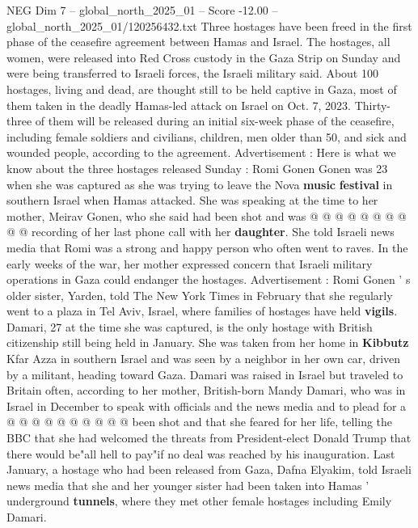 \begin{textsample}{NEG Dim 7 – global\_north\_2025\_01 – Score -12.00 – global\_north\_2025\_01/120256432.txt}  \label{ex:f7_neg_051}
Three hostages have been freed in the first phase of the ceasefire agreement between Hamas and Israel.
The hostages, all women, were released into Red Cross custody in the Gaza Strip on Sunday and were being transferred to Israeli forces, the Israeli military said.
About 100 hostages, living and dead, are thought still to be held captive in Gaza, most of them taken in the deadly Hamas-led attack on Israel on Oct. 7, 2023.
Thirty-three of them will be released during an initial six-week phase of the ceasefire, including female soldiers and civilians, children, men older than 50, and sick and wounded people, according to the agreement.
Advertisement : Here is what we know about the three hostages released Sunday : Romi Gonen Gonen was 23 when she was captured as she was trying to leave the Nova \textbf{music} \textbf{festival} in southern Israel when Hamas attacked.
She was speaking at the time to her mother, Meirav Gonen, who she said had been shot and was @ @ @ @ @ @ @ @ @ @ recording of her last phone call with her \textbf{daughter}.
She told Israeli news media that Romi was a strong and happy person who often went to raves.
In the early weeks of the war, her mother expressed concern that Israeli military operations in Gaza could endanger the hostages.
Advertisement : Romi Gonen ' s older sister, Yarden, told The New York Times in February that she regularly went to a plaza in Tel Aviv, Israel, where families of hostages have held \textbf{vigils}.
Damari, 27 at the time she was captured, is the only hostage with British citizenship still being held in January.
She was taken from her home in \textbf{Kibbutz} Kfar Azza in southern Israel and was seen by a neighbor in her own car, driven by a militant, heading toward Gaza.
Damari was raised in Israel but traveled to Britain often, according to her mother, British-born Mandy Damari, who was in Israel in December to speak with officials and the news media and to plead for a @ @ @ @ @ @ @ @ @ @ been shot and that she feared for her life, telling the BBC that she had welcomed the threats from President-elect Donald Trump that there would be"all hell to pay"if no deal was reached by his inauguration.
Last January, a hostage who had been released from Gaza, Dafna Elyakim, told Israeli news media that she and her younger sister had been taken into Hamas ' underground \textbf{tunnels}, where they met other female hostages including Emily Damari.

\end{textsample}
